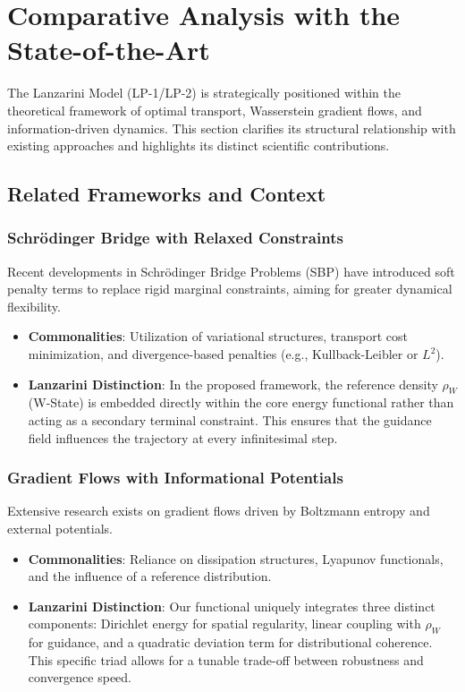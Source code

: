 \section{Comparative Analysis with the State-of-the-Art}

The Lanzarini Model (LP-1/LP-2) is strategically positioned within the theoretical framework of optimal transport, Wasserstein gradient flows, and information-driven dynamics. This section clarifies its structural relationship with existing approaches and highlights its distinct scientific contributions.

\subsection{Related Frameworks and Context}

\subsubsection{Schrödinger Bridge with Relaxed Constraints}
Recent developments in Schrödinger Bridge Problems (SBP) have introduced soft penalty terms to replace rigid marginal constraints, aiming for greater dynamical flexibility.
\begin{itemize}
    \item \textbf{Commonalities}: Utilization of variational structures, transport cost minimization, and divergence-based penalties (e.g., Kullback-Leibler or $L^2$).
    \item \textbf{Lanzarini Distinction}: In the proposed framework, the reference density $\rho_W$ (W-State) is embedded directly within the core energy functional rather than acting as a secondary terminal constraint. This ensures that the guidance field influences the trajectory at every infinitesimal step.
\end{itemize}

\subsubsection{Gradient Flows with Informational Potentials}
Extensive research exists on gradient flows driven by Boltzmann entropy and external potentials.
\begin{itemize}
    \item \textbf{Commonalities}: Reliance on dissipation structures, Lyapunov functionals, and the influence of a reference distribution.
    \item \textbf{Lanzarini Distinction}: Our functional uniquely integrates three distinct components: Dirichlet energy for spatial regularity, linear coupling with $\rho_W$ for guidance, and a quadratic deviation term for distributional coherence. This specific triad allows for a tunable trade-off between robustness and convergence speed.
\end{itemize}

